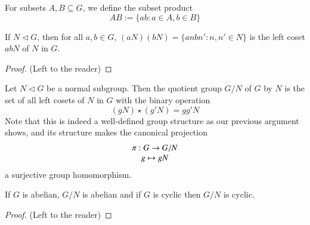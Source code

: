 \documentclass[12pt, a4paper, oneside, openright, titlepage]{book}
\begin{document}
\begin{nota}
        For subsets $A,B\subseteq G$, we define the subset product \begin{equation}
                AB := \{ab:a\in A, b \in B\}
        \end{equation}
\end{nota}

\begin{lem}
        If $N \vartriangleleft G$, then for all $a,b \in G$, $(aN)(bN) = \{anbn':n,n' \in N\}$ is the left coset $abN$ of $N$ in $G$.
\end{lem}
\begin{proof}
        (Left to the reader)
\end{proof}


\begin{defn}
        Let $N \vartriangleleft G$ be a normal subgroup. Then the quotient group $G/N$ of $G$ by $N$ is the set of all left cosets of $N$ in $G$ with the binary operation \begin{equation}
                (gN)\star(g'N) = gg'N
        \end{equation}
        Note that this is indeed a well-defined group structure as our previous argument shows, and its structure makes the canonical projection \begin{equation}
                \begin{array}{c} \pi:G\rightarrow G/N \\ g\mapsto gN \end{array}
        \end{equation}
        a surjective group homomorphism.
\end{defn}

\begin{cor}
        If $G$ is abelian, $G/N$ is abelian and if $G$ is cyclic then $G/N$ is cyclic.
\end{cor}
\begin{proof}
        (Left to the reader)
\end{proof}
\end{document}
